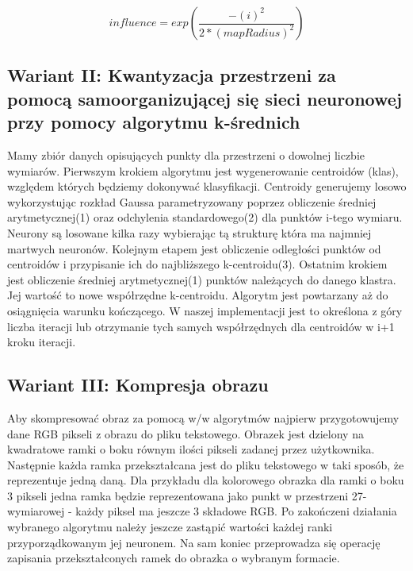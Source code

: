 \documentclass{classrep}
\begin{document}
{{\begin{equation}
influence=exp(\dfrac{-(i)^2}{2*(mapRadius)^2})
\end{equation}

\subsection*{Wariant II: Kwantyzacja przestrzeni za pomocą samoorganizującej się sieci neuronowej przy pomocy algorytmu k-średnich}
Mamy zbiór danych opisujących punkty dla przestrzeni o dowolnej liczbie wymiarów. Pierwszym krokiem algorytmu jest wygenerowanie centroidów (klas), względem których będziemy dokonywać klasyfikacji. Centroidy generujemy losowo wykorzystując rozkład Gaussa parametryzowany poprzez obliczenie średniej arytmetycznej(1) oraz odchylenia standardowego(2) dla punktów i-tego wymiaru. Neurony są losowane kilka razy wybierając tą strukturę która ma najmniej martwych neuronów. Kolejnym etapem jest obliczenie odległości punktów od centroidów i przypisanie ich do najbliższego k-centroidu(3). Ostatnim krokiem jest obliczenie średniej arytmetycznej(1) punktów należących do danego klastra. Jej wartość to nowe współrzędne k-centroidu. Algorytm jest powtarzany aż do osiągnięcia warunku kończącego. W naszej implementacji jest to określona z góry liczba iteracji lub otrzymanie tych samych współrzędnych dla centroidów w i+1 kroku iteracji.

\subsection*{Wariant III: Kompresja obrazu}
Aby skompresować obraz za pomocą w/w algorytmów najpierw przygotowujemy dane RGB pikseli z obrazu do pliku tekstowego. Obrazek jest dzielony na kwadratowe ramki o boku równym ilości pikseli zadanej przez użytkownika. Następnie każda ramka przekształcana jest do pliku tekstowego w taki sposób, że reprezentuje jedną daną. Dla przykładu dla kolorowego obrazka dla ramki o boku 3 pikseli jedna ramka będzie reprezentowana jako punkt w przestrzeni 27-wymiarowej - każdy piksel ma jeszcze 3 składowe RGB. Po zakończeni działania wybranego algorytmu należy jeszcze zastąpić wartości każdej ranki przyporządkowanym jej neuronem. Na sam koniec przeprowadza się operację zapisania przekształconych ramek do obrazka o wybranym formacie. 

}}
\end{document}
